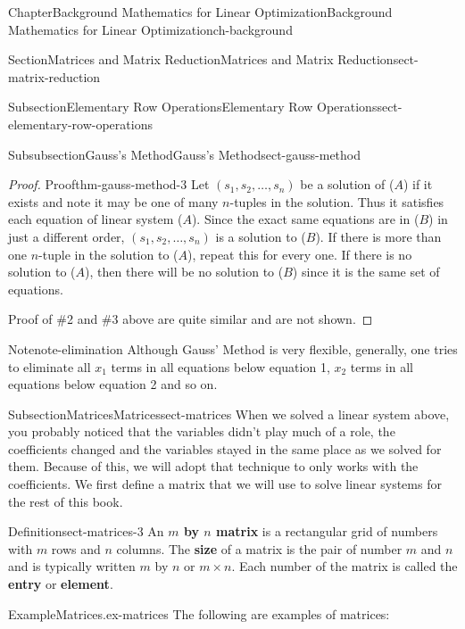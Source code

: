 \documentclass[oneside,10pt,]{book}
\newcommand{\terminology}[1]{\textbf{#1}}
\numberwithin{equation}{section}
\begin{document}
\begin{chapterptx}{Chapter}{Background Mathematics for Linear Optimization}{}{Background Mathematics for Linear Optimization}{}{}{ch-background}
\begin{sectionptx}{Section}{Matrices and Matrix Reduction}{}{Matrices and Matrix Reduction}{}{}{sect-matrix-reduction}
\begin{subsectionptx}{Subsection}{Elementary Row Operations}{}{Elementary Row Operations}{}{}{sect-elementary-row-operations}
\begin{subsubsectionptx}{Subsubsection}{Gauss's Method}{}{Gauss's Method}{}{}{sect-gauss-method}
\begin{proof}{Proof}{}{thm-gauss-method-3}
Let \((s_1,s_2, \ldots, s_n)\) be a solution of (\(A\)) if it exists and note it may be one of many \(n\)-tuples in the solution. Thus it satisfies each equation of linear system (\(A\)). Since the exact same equations are in (\(B\)) in just a different order, \((s_1,s_2,\ldots,s_n)\) is a solution to (\(B\)). If there is more than one \(n\)-tuple in the solution to (\(A\)), repeat this for every one. If there is no solution to (\(A\)), then there will be no solution to (\(B\)) since it is the same set of equations.%
\par
Proof of \#2 and \#3 above are quite similar and are not shown.%
\end{proof}
\begin{note}{Note}{}{note-elimination}%
Although Gauss' Method is very flexible, generally, one tries to eliminate all \(x_1\) terms in all equations below equation 1, \(x_2\) terms in all equations below equation 2 and so on.%
\end{note}
\end{subsubsectionptx}
\end{subsectionptx}
%
%
\typeout{************************************************}
\typeout{************************************************}
%
\begin{subsectionptx}{Subsection}{Matrices}{}{Matrices}{}{}{sect-matrices}
When we solved a linear system above, you probably noticed that the variables didn't play much of a role, the coefficients changed and the variables stayed in the same place as we solved for them. Because of this, we will adopt that technique to only works with the coefficients. We first define a matrix that we will use to solve linear systems for the rest of this book.%
\begin{definition}{Definition}{}{sect-matrices-3}%
An \terminology{\(m\) by \(n\) matrix} is a rectangular grid of numbers with \(m\) rows and \(n\) columns. The \terminology{size} of a matrix is the pair of number \(m\) and \(n\) and is typically written \(m\) by \(n\) or \(m \times n\). Each number of the matrix is called the \terminology{entry} or \terminology{element}.%
\end{definition}
\begin{example}{Example}{Matrices.}{ex-matrices}%
The following are examples of matrices:%
\par
%
\begin{equation*}

\end{equation*}
\end{example}
\end{subsectionptx}
\end{sectionptx}
\end{chapterptx}
\end{document}
